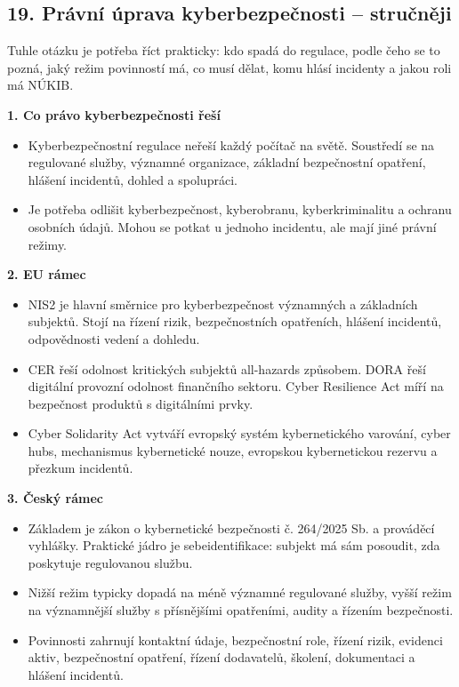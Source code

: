 
\subsection*{19. Právní úprava kyberbezpečnosti -- stručněji}
Tuhle otázku je potřeba říct prakticky: kdo spadá do regulace, podle čeho se to pozná, jaký režim povinností má, co musí dělat, komu hlásí incidenty a jakou roli má NÚKIB.

\textbf{1. Co právo kyberbezpečnosti řeší}
\begin{itemize}
  \item Kyberbezpečnostní regulace neřeší každý počítač na světě. Soustředí se na regulované služby, významné organizace, základní bezpečnostní opatření, hlášení incidentů, dohled a spolupráci.
  \item Je potřeba odlišit kyberbezpečnost, kyberobranu, kyberkriminalitu a ochranu osobních údajů. Mohou se potkat u jednoho incidentu, ale mají jiné právní režimy.
\end{itemize}

\textbf{2. EU rámec}
\begin{itemize}
  \item NIS2 je hlavní směrnice pro kyberbezpečnost významných a základních subjektů. Stojí na řízení rizik, bezpečnostních opatřeních, hlášení incidentů, odpovědnosti vedení a dohledu.
  \item CER řeší odolnost kritických subjektů all-hazards způsobem. DORA řeší digitální provozní odolnost finančního sektoru. Cyber Resilience Act míří na bezpečnost produktů s digitálními prvky.
  \item Cyber Solidarity Act vytváří evropský systém kybernetického varování, cyber hubs, mechanismus kybernetické nouze, evropskou kybernetickou rezervu a přezkum incidentů.
\end{itemize}

\textbf{3. Český rámec}
\begin{itemize}
  \item Základem je zákon o kybernetické bezpečnosti č. 264/2025 Sb. a prováděcí vyhlášky. Praktické jádro je sebeidentifikace: subjekt má sám posoudit, zda poskytuje regulovanou službu.
  \item Nižší režim typicky dopadá na méně významné regulované služby, vyšší režim na významnější služby s přísnějšími opatřeními, audity a řízením bezpečnosti.
  \item Povinnosti zahrnují kontaktní údaje, bezpečnostní role, řízení rizik, evidenci aktiv, bezpečnostní opatření, řízení dodavatelů, školení, dokumentaci a hlášení incidentů.
\end{itemize}

